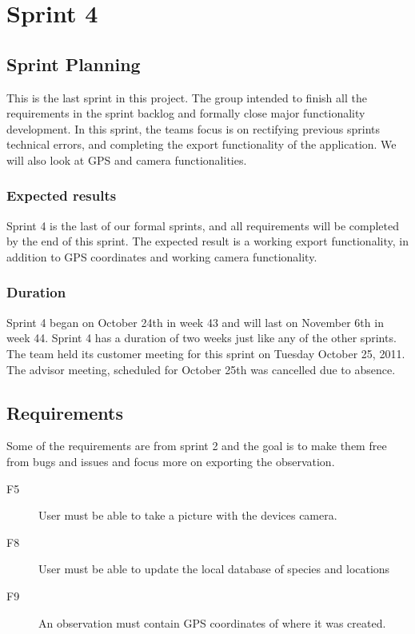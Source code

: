 \section{Sprint 4}

\subsection{Sprint Planning}

This is the last sprint in this project. The group intended to finish all the
requirements in the sprint backlog and formally close major functionality
development. 
In this sprint, the teams focus is on rectifying previous sprints technical
errors, and completing the export functionality of the application. We will also
look at GPS and camera functionalities.

\subsubsection{Expected results}
Sprint 4 is the last of our formal sprints, and all requirements will be
completed by the end of this sprint. The expected result is a working export
functionality, in addition to GPS coordinates and working camera functionality.

\subsubsection{Duration}
Sprint 4 began on October 24th in week 43 and will last on November 6th in week
44. Sprint 4 has a duration of two weeks just like any of the other sprints.
The team held its customer meeting for this sprint on Tuesday October 25, 2011.
The advisor meeting, scheduled for October 25th was cancelled due to absence. 

\subsection{Requirements}
Some of the requirements are from sprint 2 and the goal is to make them free
from bugs and issues and focus more on exporting the observation.

\begin{description}
	\item[F5] User must be able to take a picture with the devices camera.
	\item[F8] User must be able to update the local database of species and locations
	\item[F9] An observation must contain GPS coordinates of where it was created.
\end{description}

